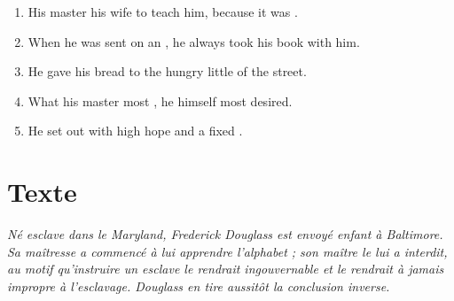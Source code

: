 \documentclass{fiche}
\begin{document}
\begin{anglais}
\begin{enumerate}[label=\arabic*.,itemsep=2mm,leftmargin=*]
  \item His master  his wife to teach him, because it was .
  \item When he was sent on an , he always took his book with him.
  \item He gave his bread to the hungry little  of the street.
  \item What his master most , he himself most desired.
  \item He set out with high hope and a fixed .
\end{enumerate}
\end{anglais}

\newpage
\section{Texte}

\noindent\small\textit{Né esclave dans le Maryland, Frederick Douglass est envoyé enfant à
Baltimore. Sa maîtresse a commencé à lui apprendre l'alphabet ; son maître le lui a interdit,
au motif qu'instruire un esclave le rendrait \og ingouvernable \fg{} et le rendrait à jamais
impropre à l'esclavage. Douglass en tire aussitôt la conclusion inverse.}\normalsize
\end{document}
